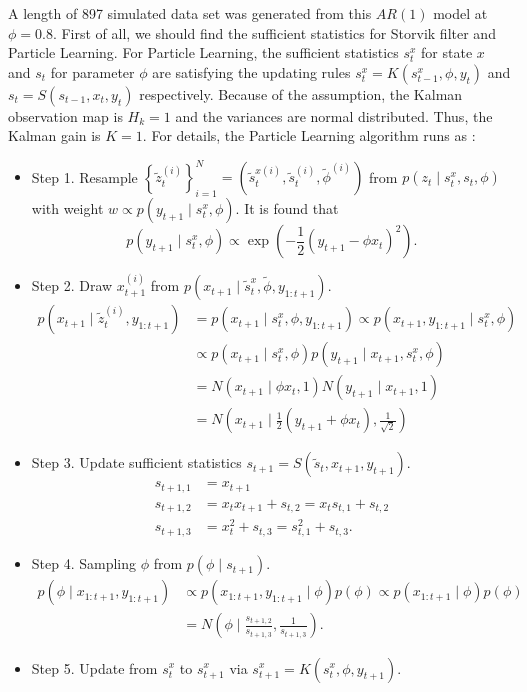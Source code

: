 A length of 897 simulated data set was generated from this $\mathit{AR}\left(1\right)$ model at $\phi=0.8$. First of all, we should find the sufficient statistics for Storvik filter and Particle Learning. For Particle Learning, the sufficient statistics $s_t^x$ for state $x$ and $s_t$ for parameter $\phi$ are satisfying the updating rules $s_t^x=K\left(s_{t-1}^x,\phi ,y_t\right)$ and $s_t=S\left(s_{t-1},x_t,y_t\right)$ respectively. Because of the assumption, the Kalman observation map is $H_k=1$ and the variances are normal distributed. Thus, the Kalman gain is $K=1$. For details, the Particle Learning algorithm runs as : 
\begin{itemize}\itemsep0em 
\item Step 1. Resample $\left\lbrace \tilde{z}_t^{\left(i\right)}\right\rbrace_{i=1}^N=\left(\tilde{s}_t^{x\left(i\right)},\tilde{s}_t^{\left(i\right)},\tilde{\phi }^{\left(i\right)}\right)$ from $p\left(z_t\mid s_t^x,s_t,\phi \right)$ with weight $w\propto p\left(y_{t+1}\mid s_{t}^x,\phi \right)$. It is found that 
\begin{equation*}
p\left(y_{t+1}\mid s_{t}^x,\phi \right) \propto \exp \left(-\frac{1}{2}\left(y_{t+1}-\phi  x_{t}\right)^2 \right).
\end{equation*}
\item Step 2. Draw $x_{t+1}^{\left(i\right)}$ from $p\left(x_{t+1}\mid \tilde{s}_t^x,\tilde{\phi },y_{1:t+1}\right)$. 
\begin{align*}
p\left(x_{t+1}\mid \tilde{z}_t^{\left(i\right)},y_{1:t+1}\right) &= p\left(x_{t+1}\mid s_t^x,\phi,y_{1:t+1}\right) \propto p\left(x_{t+1},y_{1:t+1}\mid s_t^x,\phi\right)\\
& \propto p\left(x_{t+1}\mid s_t^x,\phi\right)p\left(y_{t+1}\mid x_{t+1},s_t^x,\phi\right) \\
&= N\left(x_{t+1}\mid \phi x_t,1\right)N\left(y_{t+1}\mid x_{t+1},1\right)\\
&= N\left(x_{t+1}\mid \frac{1}{2}\left(y_{t+1}+\phi x_t\right),\frac{1}{\sqrt{2}}\right)
\end{align*}
\item Step 3. Update sufficient statistics  $s_{t+1}=S\left(\tilde{s}_{t}, x_{t+1},y_{t+1}\right)$.
\begin{align*}
s_{t+1,1} &= x_{t+1} \\
s_{t+1,2} &= x_tx_{t+1}+s_{t,2} = x_ts_{t,1}+s_{t,2} \\
s_{t+1,3} &= x_{t}^2 + s_{t,3} = s_{t,1}^2 + s_{t,3} .
\end{align*}
\item Step 4. Sampling $\phi $ from $p\left(\phi  \mid  s_{t+1}\right)$.
\begin{align*}
p\left(\phi  \mid  x_{1:t+1},y_{1:t+1}\right) & \propto p\left(x_{1:t+1},y_{1:t+1}\mid \phi \right)p\left(\phi \right)\propto p\left(x_{1:t+1}\mid \phi \right)p\left(\phi \right)\\
&= N\left( \phi \mid  \frac{s_{t+1,2}}{s_{t+1,3}},\frac{1}{s_{t+1,3}} \right).
\end{align*}
\item Step 5. Update from $s_{t}^x$ to $s_{t+1}^x$ via $s_{t+1}^x = K\left(s_{t}^x,\phi ,y_{t+1}\right)$.
\end{itemize}


